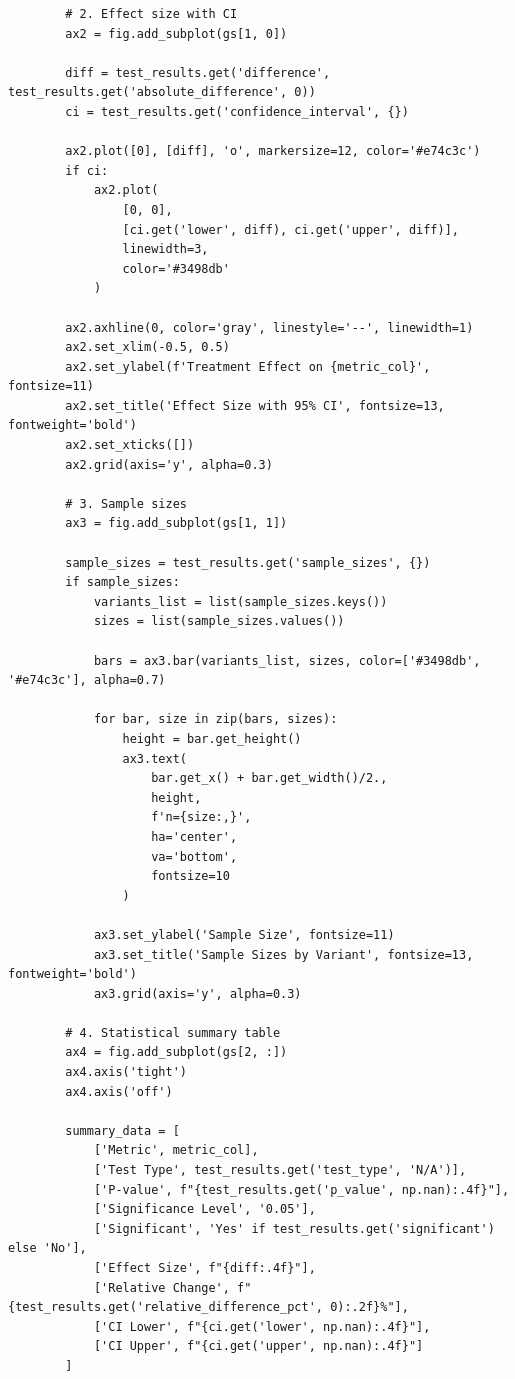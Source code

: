 \begin{lstlisting}
        # 2. Effect size with CI
        ax2 = fig.add_subplot(gs[1, 0])

        diff = test_results.get('difference', test_results.get('absolute_difference', 0))
        ci = test_results.get('confidence_interval', {})

        ax2.plot([0], [diff], 'o', markersize=12, color='#e74c3c')
        if ci:
            ax2.plot(
                [0, 0],
                [ci.get('lower', diff), ci.get('upper', diff)],
                linewidth=3,
                color='#3498db'
            )

        ax2.axhline(0, color='gray', linestyle='--', linewidth=1)
        ax2.set_xlim(-0.5, 0.5)
        ax2.set_ylabel(f'Treatment Effect on {metric_col}', fontsize=11)
        ax2.set_title('Effect Size with 95% CI', fontsize=13, fontweight='bold')
        ax2.set_xticks([])
        ax2.grid(axis='y', alpha=0.3)

        # 3. Sample sizes
        ax3 = fig.add_subplot(gs[1, 1])

        sample_sizes = test_results.get('sample_sizes', {})
        if sample_sizes:
            variants_list = list(sample_sizes.keys())
            sizes = list(sample_sizes.values())

            bars = ax3.bar(variants_list, sizes, color=['#3498db', '#e74c3c'], alpha=0.7)

            for bar, size in zip(bars, sizes):
                height = bar.get_height()
                ax3.text(
                    bar.get_x() + bar.get_width()/2.,
                    height,
                    f'n={size:,}',
                    ha='center',
                    va='bottom',
                    fontsize=10
                )

            ax3.set_ylabel('Sample Size', fontsize=11)
            ax3.set_title('Sample Sizes by Variant', fontsize=13, fontweight='bold')
            ax3.grid(axis='y', alpha=0.3)

        # 4. Statistical summary table
        ax4 = fig.add_subplot(gs[2, :])
        ax4.axis('tight')
        ax4.axis('off')

        summary_data = [
            ['Metric', metric_col],
            ['Test Type', test_results.get('test_type', 'N/A')],
            ['P-value', f"{test_results.get('p_value', np.nan):.4f}"],
            ['Significance Level', '0.05'],
            ['Significant', 'Yes' if test_results.get('significant') else 'No'],
            ['Effect Size', f"{diff:.4f}"],
            ['Relative Change', f"{test_results.get('relative_difference_pct', 0):.2f}%"],
            ['CI Lower', f"{ci.get('lower', np.nan):.4f}"],
            ['CI Upper', f"{ci.get('upper', np.nan):.4f}"]
        ]


\end{lstlisting}
